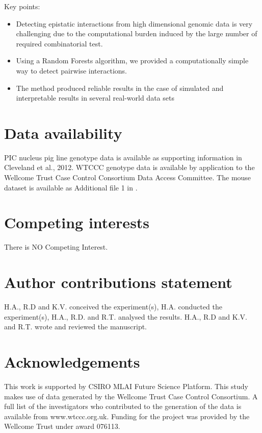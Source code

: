 \documentclass[preprint,12pt,3p]{elsarticle}
\begin{document}
Key points:
\begin{itemize}
\item Detecting epistatic interactions from high dimensional genomic data is very challenging due to the computational
  burden induced by the large number of required combinatorial test.
\item Using a Random Forests algorithm, we provided a computationally simple way to detect pairwise interactions.
\item The method produced reliable results in the case of simulated and interpretable results in several real-world
  data sets
\end{itemize}



\appendix

\section{Data availability}
PIC nucleus pig line genotype data is available as supporting information in Cleveland et al., 2012. WTCCC genotype data
is available by application to the Wellcome Trust Case Control Consortium Data Access Committee. The mouse dataset is
available as Additional file 1 in \cite{martiniGenomicPredictionEpistasis2017}.


\FloatBarrier
\section{Competing interests}
There is NO Competing Interest.

\section{Author contributions statement}
H.A., R.D and K.V. conceived the experiment(s), H.A. conducted
the experiment(s), H.A., R.D. and R.T. analysed the results.  H.A., R.D and K.V. and R.T.  wrote and reviewed the manuscript.

\section{Acknowledgements}
This work is supported by CSIRO MLAI Future
Science Platform. This study makes use of data generated by the Wellcome Trust Case Control Consortium. A full list of
the investigators who contributed to the generation of the data is available from www.wtccc.org.uk. Funding for the
project was provided by the Wellcome Trust under award 076113.




%
%




\end{document}
